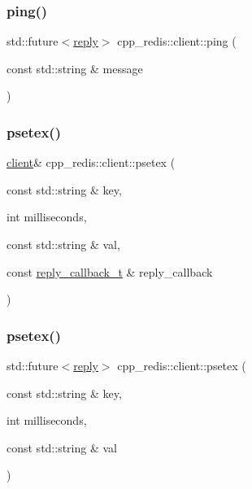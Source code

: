 \mbox{\label{classcpp__redis_1_1client_a5efa4ecc6b105a2464b22cd873caae39}} 
\subsubsection{\texorpdfstring{ping()}{ping()}\hspace{0.1cm}{\footnotesize\ttfamily [4/4]}}
{\footnotesize\ttfamily std\+::future$<$\hyperlink{classcpp__redis_1_1reply}{reply}$>$ cpp\+\_\+redis\+::client\+::ping (\begin{DoxyParamCaption}\item[{const std\+::string \&}]{message }\end{DoxyParamCaption})}

\mbox{\label{classcpp__redis_1_1client_a732ba849342f9d8c67111f6cb6cb198c}} 
\subsubsection{\texorpdfstring{psetex()}{psetex()}\hspace{0.1cm}{\footnotesize\ttfamily [1/2]}}
{\footnotesize\ttfamily \hyperlink{classcpp__redis_1_1client}{client}\& cpp\+\_\+redis\+::client\+::psetex (\begin{DoxyParamCaption}\item[{const std\+::string \&}]{key,  }\item[{int}]{milliseconds,  }\item[{const std\+::string \&}]{val,  }\item[{const \hyperlink{classcpp__redis_1_1client_a061a1140d36d2eaeda82b09a0bb3f9f2}{reply\+\_\+callback\+\_\+t} \&}]{reply\+\_\+callback }\end{DoxyParamCaption})}

\mbox{\label{classcpp__redis_1_1client_a69712c925c1496ab9531a5fd1888ad93}} 
\subsubsection{\texorpdfstring{psetex()}{psetex()}\hspace{0.1cm}{\footnotesize\ttfamily [2/2]}}
{\footnotesize\ttfamily std\+::future$<$\hyperlink{classcpp__redis_1_1reply}{reply}$>$ cpp\+\_\+redis\+::client\+::psetex (\begin{DoxyParamCaption}\item[{const std\+::string \&}]{key,  }\item[{int}]{milliseconds,  }\item[{const std\+::string \&}]{val }\end{DoxyParamCaption})}

